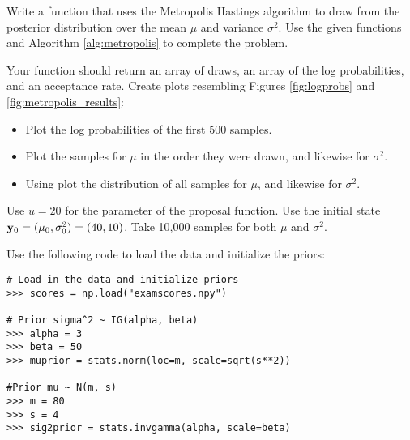 \begin{comment}
\begin{figure}[h]
\centering
\texttt{[image: figures/logprobs.pdf]}
\caption{Log probabilities of our samples.}
\end{figure}

From this we can see that after between $300$ and $500$ iterations, we had converged to the correct distribution. We can visualize the path of our sampler by plotting the samples themselves:
\begin{figure}[h]
\centering
\texttt{[image: figures/samples.pdf]}
\caption{Samples from the Metropolis algorithm.}
\end{figure}

\begin{problem}
Using $\mu$ and $\Sigma$ as defined previously and using an initial state $\mathbf{x} = \left[ \begin{array}{cc} 1000 & -1000 \end{array} \right]$ run your Metropolis sampler for $10000$ iterations. Plot the log probs as well as the samples. How long did it take to converge?
\end{problem}
\end{comment}

\begin{problem}
Write a function that uses the Metropolis Hastings algorithm to draw from the posterior distribution over the mean $\mu$ and variance $\sigma^2$. Use the given functions and Algorithm \ref{alg:metropolis} to complete the problem.

Your function should return an array of draws, an array of the log probabilities, and an acceptance rate. 
Create plots resembling Figures \ref{fig:logprobs} and \ref{fig:metropolis_results}:
\begin{itemize}
\item Plot the log probabilities of the first 500 samples.
\item Plot the samples for $\mu$ in the order they were drawn, and likewise for $\sigma^2$.
\item Using  plot the distribution of all samples for $\mu$, and likewise for $\sigma^2$.
\end{itemize}

Use $u=20$ for the parameter of the proposal function.
Use the initial state $\mathbf{y}_0=(\mu_0,\sigma^2_0)=(40,10)$.
Take 10,000 samples for both $\mu$ and $\sigma^2$. 

Use the following code to load the data and initialize the priors:
\begin{lstlisting}
# Load in the data and initialize priors
>>> scores = np.load("examscores.npy")

# Prior sigma^2 ~ IG(alpha, beta)
>>> alpha = 3
>>> beta = 50
>>> muprior = stats.norm(loc=m, scale=sqrt(s**2))

#Prior mu ~ N(m, s)
>>> m = 80
>>> s = 4
>>> sig2prior = stats.invgamma(alpha, scale=beta)
\end{lstlisting}

\end{problem}

